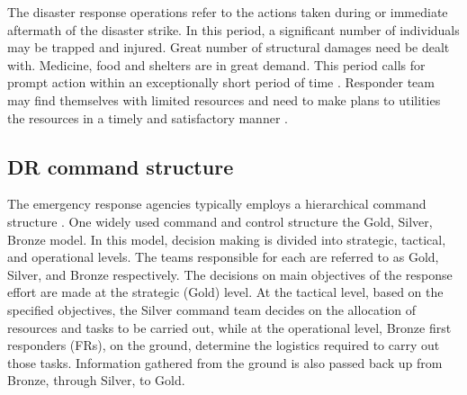 The disaster response operations refer to the actions taken during or immediate aftermath of the disaster strike. In this period, a significant number of individuals may be trapped and injured. Great number of structural damages need be dealt with. Medicine, food and shelters are in great demand. This period calls for prompt action within an exceptionally short period of time \cite{Wattegama2012}. Responder team may find themselves with limited resources and need to make plans to utilities the resources in a timely and satisfactory manner \cite{Chen2005,Chen2008}. \\



\subsection{DR command structure}
The emergency response agencies typically employs a hierarchical command structure \cite{Ramchurn}. One widely used command and control structure the Gold, Silver, Bronze model. In this model, decision making is divided into strategic, tactical, and operational levels. The teams responsible for each are referred to as Gold, Silver, and Bronze respectively. The decisions on main objectives of the response effort are made at the strategic (Gold) level. At the tactical level, based on the specified objectives, the Silver command team decides on the allocation of resources and tasks to be carried out, while at the operational level, Bronze first responders (FRs), on the ground, determine the logistics required to carry out those tasks. Information gathered from the ground is also passed back up from Bronze, through Silver, to Gold.\\

